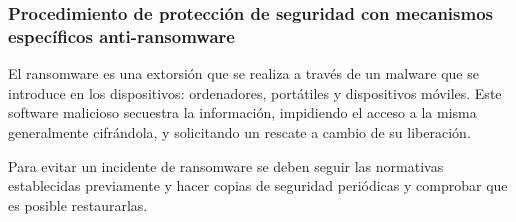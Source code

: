 
\subsubsection{Procedimiento de protección de seguridad con mecanismos específicos anti-ransomware}

El ransomware es una extorsión que se realiza a través de un malware que se introduce en los dispositivos: ordenadores, portátiles y dispositivos móviles. Este software malicioso secuestra la información, impidiendo el acceso a la misma generalmente cifrándola, y solicitando un rescate a cambio de su liberación.

Para evitar un incidente de ransomware se deben seguir las normativas establecidas previamente y hacer copias de seguridad periódicas y comprobar que es posible restaurarlas.

